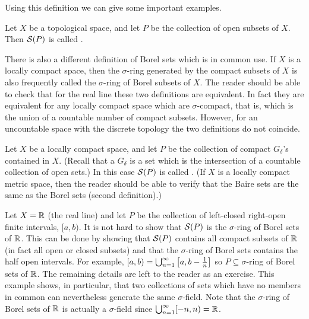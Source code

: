 Using this definition we can give some important examples.

\begin{example}
Let $X$ be a topological space, and let $P$ be the collection of open subsets of $X$. Then ${\cal S}(P)$ is called . 
\end{example}

There is also a different definition of Borel sets which is in common use. If $X$ is a locally compact space, then the $\sigma$-ring generated by the compact subsets of $X$ is also frequently called the $\sigma$-ring of Borel subsets of $X$. The reader should be able to check that for the real line these two definitions are equivalent. In fact they are equivalent for any locally compact space which are $\sigma$-compact, that is, which is the union of a countable number of compact subsets. However, for an uncountable space with the discrete topology the two definitions do not coincide.

\begin{example}
Let $X$ be a locally compact space, and let $P$ be the collection of compact $G_\delta$'s contained in $X$. (Recall that a $G_\delta$ is a set which is the intersection of a countable collection of open sets.) In this case ${\cal S}(P)$ is called . (If $X$ is a locally compact metric space, then the reader should be able to verify that the Baire sets are the same as the Borel sets (second definition).)
\end{example}

\begin{example}\label{ex:borel for reals}
Let $X=\mathbb{R}$ (the real line) and let $P$ be the collection of left-closed right-open finite intervals, $[a,b)$. It is not hard to show that ${\cal S}(P)$ is the $\sigma$-ring of Borel sets of $\mathbb{R}$. This can be done by showing that ${\cal S}(P)$ contains all compact subsets of $\mathbb{R}$ (in fact all open or closed subsets) and that the $\sigma$-ring of Borel sets contains the half open intervals. For example, $[a,b)=\bigcup_{n=1}^\infty\left[a,b-\frac1n\right]$ so $P\subseteq\sigma$-ring of Borel sets of $\mathbb{R}$. The remaining details are left to the reader as an exercise. This example shows, in particular, that two collections of sets which have no members in common can nevertheless generate the same $\sigma$-field. Note that the $\sigma$-ring of Borel sets of $\mathbb{R}$ is actually a $\sigma$-field since $\bigcup_{n=1}^\infty[-n,n)=\mathbb{R}$.
\end{example}

